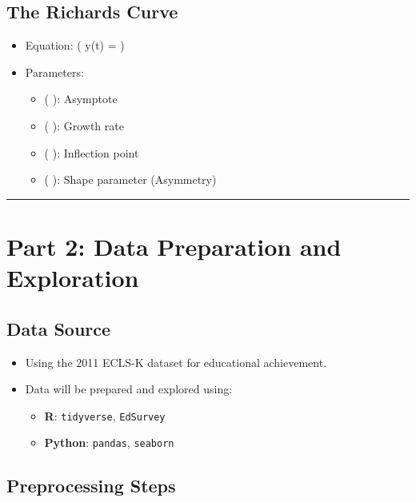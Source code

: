 \documentclass[
  letterpaper,
  DIV=11,
  numbers=noendperiod]{scrreprt}
\providecommand{\tightlist}{%
  \setlength{\itemsep}{0pt}\setlength{\parskip}{0pt}}\usepackage{longtable,booktabs,array}
\begin{document}
\subsection{The Richards Curve}\label{the-richards-curve}

\begin{itemize}
\tightlist
\item
  Equation: ( y(t) =
  )
\item
  Parameters:

  \begin{itemize}
  \tightlist
  \item
    ( \alpha ): Asymptote
  \item
    ( \beta ): Growth rate
  \item
    ( \gamma ): Inflection point
  \item
    ( \delta ): Shape parameter (Asymmetry)
  \end{itemize}
\end{itemize}

\begin{center}\rule{0.5\linewidth}{0.5pt}\end{center}

\section{Part 2: Data Preparation and
Exploration}\label{part-2-data-preparation-and-exploration}

\subsection{Data Source}\label{data-source}

\begin{itemize}
\tightlist
\item
  Using the 2011 ECLS-K dataset for educational achievement.
\item
  Data will be prepared and explored using:

  \begin{itemize}
  \tightlist
  \item
    \textbf{R}: \texttt{tidyverse}, \texttt{EdSurvey}
  \item
    \textbf{Python}: \texttt{pandas}, \texttt{seaborn}
  \end{itemize}
\end{itemize}

\subsection{Preprocessing Steps}\label{preprocessing-steps}
\end{document}
